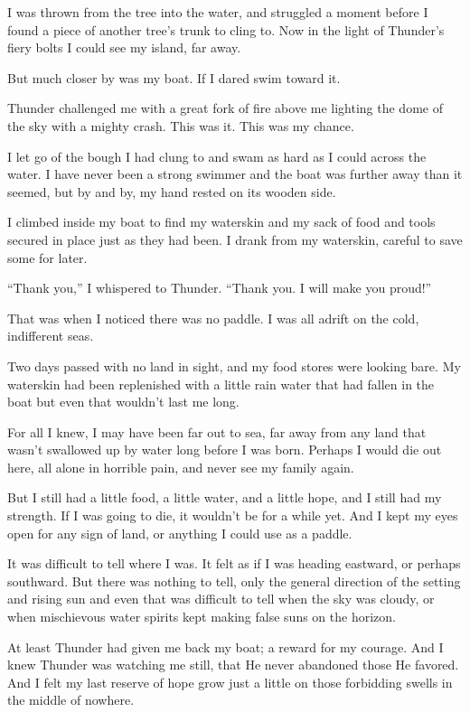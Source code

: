 I was thrown from the tree into the water, and struggled a moment before I found a piece of another tree's trunk to cling to. Now in the light of Thunder's fiery bolts I could see my island, far away.

But much closer by was my boat. If I dared swim toward it.

Thunder challenged me with a great fork of fire above me lighting the dome of the sky with a mighty crash. This was it. This was my chance.

I let go of the bough I had clung to and swam as hard as I could across the water. I have never been a strong swimmer and the boat was further away than it seemed, but by and by, my hand rested on its wooden side.

I climbed inside my boat to find my waterskin and my sack of food and tools secured in place just as they had been. I drank from my waterskin, careful to save some for later.

``Thank you,'' I whispered to Thunder. ``Thank you. I will make you proud!''

That was when I noticed there was no paddle. I was all adrift on the cold, indifferent seas.

\secdiv

\noindent Two days passed with no land in sight, and my food stores were looking bare. My waterskin had been replenished with a little rain water that had fallen in the boat but even that wouldn't last me long.

For all I knew, I may have been far out to sea, far away from any land that wasn't swallowed up by water long before I was born. Perhaps I would die out here, all alone in horrible pain, and never see my family again.

But I still had a little food, a little water, and a little hope, and I still had my strength. If I was going to die, it wouldn't be for a while yet. And I kept my eyes open for any sign of land, or anything I could use as a paddle.

It was difficult to tell where I was. It felt as if I was heading eastward, or perhaps southward. But there was nothing to tell, only the general direction of the setting and rising sun and even that was difficult to tell when the sky was cloudy, or when mischievous water spirits kept making false suns on the horizon.

At least Thunder had given me back my boat; a reward for my courage. And I knew Thunder was watching me still, that He never abandoned those He favored. And I felt my last reserve of hope grow just a little on those forbidding swells in the middle of nowhere.

